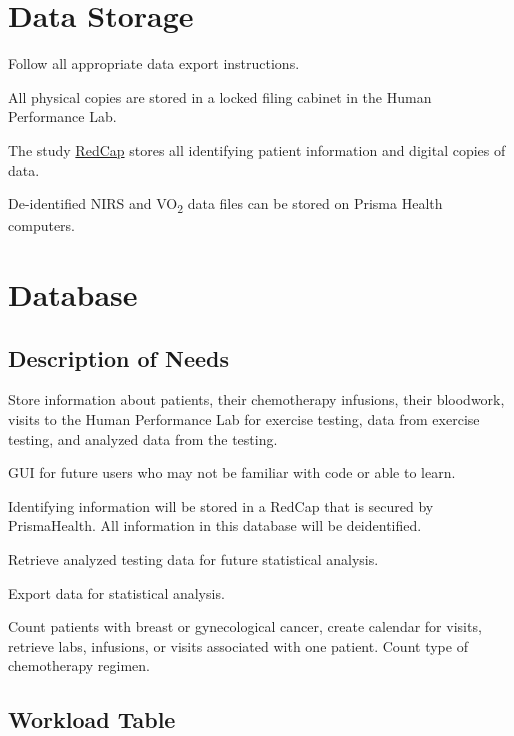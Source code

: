 \documentclass[
]{book}
\begin{document}
\hypertarget{DataStorage}{%
\chapter{Data Storage}\label{DataStorage}}

Follow all appropriate data export instructions.

All physical copies are stored in a locked filing cabinet in the Human Performance Lab.

The study \href{https://redcap.prismahealth.org}{RedCap} stores all identifying patient information and digital copies of data.

De-identified NIRS and VO\textsubscript{2} data files can be stored on Prisma Health computers.

\hypertarget{database}{%
\chapter{Database}\label{database}}

\hypertarget{description-of-needs}{%
\section{Description of Needs}\label{description-of-needs}}

Store information about patients, their chemotherapy infusions, their bloodwork, visits to the Human Performance Lab for exercise testing, data from exercise testing, and analyzed data from the testing.

GUI for future users who may not be familiar with code or able to learn.

Identifying information will be stored in a RedCap that is secured by PrismaHealth. All information in this database will be deidentified.

Retrieve analyzed testing data for future statistical analysis.

Export data for statistical analysis.

Count patients with breast or gynecological cancer, create calendar for visits, retrieve labs, infusions, or visits associated with one patient.
Count type of chemotherapy regimen.

\hypertarget{workload-table}{%
\section{Workload Table}\label{workload-table}}
\end{document}
